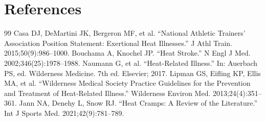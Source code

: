 \section*{References}
\begin{thebibliography}{99}
 Casa DJ, DeMartini JK, Bergeron MF, et al. ``National Athletic Trainers' Association Position Statement: Exertional Heat Illnesses.'' J Athl Train. 2015;50(9):986--1000.
 Bouchama A, Knochel JP. ``Heat Stroke.'' N Engl J Med. 2002;346(25):1978--1988.
 Naumann G, et al. ``Heat-Related Illness.'' In: Auerbach PS, ed. Wilderness Medicine. 7th ed. Elsevier; 2017.
 Lipman GS, Eifling KP, Ellis MA, et al. ``Wilderness Medical Society Practice Guidelines for the Prevention and Treatment of Heat-Related Illness.'' Wilderness Environ Med. 2013;24(4):351--361.
 Jann NA, Denehy L, Snow RJ. ``Heat Cramps: A Review of the Literature.'' Int J Sports Med. 2021;42(9):781--789.
\end{thebibliography}
